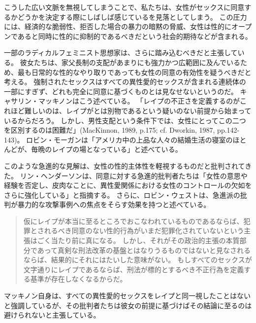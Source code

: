 \documentclass[paper=a4,book,openany]{jlreq}
\newcommand{\ig}[1]{}           %
\begin{document}
こうした広い文脈を無視してしまうことで、私たちは、女性がセックスに同意するかどうかを決定する際にしばしば感じているを見落としてしまう。
この圧力には、経済的な脆弱性、拒否した場合の暴力の暗黙の脅威、女性は性的にオープンであると同時に性的に抑制的であるべきだという社会的期待などが含まれる。

一部のラディカルフェミニスト思想家は、さらに踏み込むべきだと主張している。
彼女たちは、家父長制の支配があまりにも強力かつ広範囲に及んでいるため、最も日常的な性的なやり取りであっても女性の同意の有効性を疑うべきだと考える。
強制されたセックスはすべての異性愛的セックスが含まれる連続体の一部にすぎず、どれも完全に同意に基づくものとは見なせないというのだ。
キャサリン・マッキノン\ig{Catharine MacKinnon}はこう述べている。
「レイプの不正さを定義するのがこれほど難しいのは、レイプがとは別物であるという疑いのない前提から始まっているからだろう。
しかし、男性支配という条件下では、女性にとってこの二つを区別するのは困難だ」(MacKinnon, 1989, p.175; cf. Dworkin, 1987, pp.142-143)。
\nocite{mackinnon89:_towar_femin_theor_of_state}\nocite{dworkin87:_inter}
ロビン・モーガン\ig{Robin Morgan}は「アメリカ中の上品な人々の結婚生活の寝室のほとんどが、毎晩のレイプの場となっている」と述べている\citep[pp.136-137]{morgan80:_theor_and_pract}。

このような急進的な見解は、女性の性的主体性を軽視するものだと批判されてきた。
リン・ヘンダーソン\ig{Lynne Henderson}は、同意に対する急進的批判者たちは「女性の意思や経験を否定し、皮肉なことに、異性愛関係における女性のコントロールの欠如をさらに強化している」と指摘する\citep[p.56]{henderson93:_gettin_know}。
さらに、ロビン・ウェスト\ig{Robin West}は、急進派の批判が暴力的な攻撃事例への焦点をそらす効果を持つと述べている。

\begin{quote}
仮にレイプが本当に至るところでおこなわれているものであるならば、犯罪とされるべき同意のない性的行為がいまだ犯罪化されていないという主張はごく当たり前に真になる。
しかし、それがその政治的主張の本質部分であって真剣な刑法改革の基盤とはなりうるものではないと見なされるならば、結果的にそれにはたいした意味がない。
もしすべてのセックスが文字通りにレイプであるならば、刑法が標的とするべき不正行為を定義する基準が存在しなくなるからだ。\citep{west10:_sex_law_consen}
\end{quote}

マッキノン自身は、すべての異性愛的セックスをレイプと同一視したことはないと強調しているが、その批判者たちは彼女の前提に基づけばその結論に至るのは避けられないと主張している。
\end{document}
